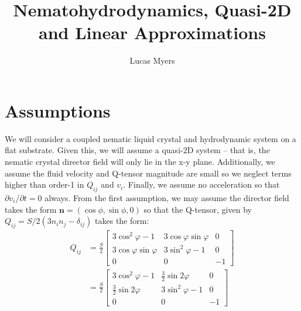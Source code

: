 \documentclass[leqno]{article}
\begin{document}
	\title{Nematohydrodynamics, Quasi-2D and Linear Approximations}
	\author{Lucas Myers}
	\maketitle
	
	\section*{Assumptions}
	We will consider a coupled nematic liquid crystal and hydrodynamic system on a flat substrate. Given this, we will assume a quasi-2D system -- that is, the nematic crystal director field will only lie in the x-y plane. Additionally, we assume the fluid velocity and Q-tensor magnitude are small so we neglect terms higher than order-1 in $Q_{ij}$ and $v_i$. Finally, we assume no acceleration so that $\partial v_i/\partial t = 0$ always. From the first assumption, we may assume the director field takes the form $\mathbf{n} = (\cos\phi, \sin\phi, 0)$ so that the Q-tensor, given by $Q_{ij} = S/2(3n_i n_j - \delta_{ij})$ takes the form:
	\begin{align*}
		Q_{ij} &= \frac{S}{2}\left[
			\begin{matrix}
				3\cos^2\varphi - 1 & 3\cos\varphi\sin\varphi & 0 \\
				3\cos\varphi\sin\varphi & 3\sin^2\varphi - 1 & 0 \\
				0 & 0 & -1
			\end{matrix}
		\right]\\
		&= \frac{S}{2}\left[
			\begin{matrix}
				3\cos^2\varphi - 1 & \frac{3}{2}\sin2\varphi & 0 \\
				\frac{3}{2}\sin2\varphi & 3\sin^2\varphi - 1 & 0 \\
				0 & 0 & -1
			\end{matrix}
		\right]
	\end{align*}
	
\end{document}
